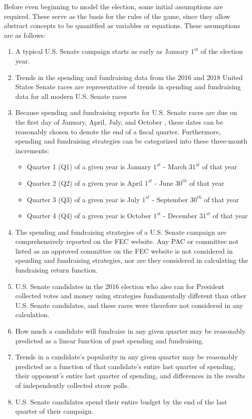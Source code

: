 \documentclass[11pt]{article}
\begin{document}
Before even beginning to model the election, some initial assumptions are
required. These serve as the basis for the rules of the game, since they allow
abstract concepts to be quanitfied as variables or equations. These assumptions
are as follows:
\begin{enumerate}
\item A typical U.S. Senate campaign starts as early as January $1^{st}$ of the
election year.
\item Trends in the spending and fundraising data from the 2016 and 2018 United
States Senate races are representative of trends in spending and fundraising
data for all modern U.S. Senate races
\item Because spending and fundraising reports for U.S. Senate races are due on
the first day of January, April, July, and October \cite{fecform}, these
dates can be reasonably chosen to denote the end of a fiscal
quarter. Furthermore, spending and fundraising strategies can be categorized
into these three-month increments:
\begin{itemize}
\item Quarter 1 (Q1) of a given year is January $1^{st}$ - March $31^{st}$ of
that year
\item Quarter 2 (Q2) of a given year is April $1^{st}$ - June $30^{th}$ of
that year
\item Quarter 3 (Q3) of a given year is July $1^{st}$ - September $30^{th}$
of that year
\item Quarter 4 (Q4) of a given year is October $1^{st}$ - December $31^{st}$
of that year
\end{itemize}
\item The spending and fundraising strategies of a U.S. Senate campaign are
comprehensively reported on the FEC website. Any PAC or committee not listed
as an approved committee on the FEC website is not considered in spending and
fundraising strategies, nor are they considered in calculating the
fundraising return function.
\item U.S. Senate candidates in the 2016 election who also ran for President
collected votes and money using strategies fundamentally different than other
U.S. Senate candidates, and these races were therefore not considered in any
calculation.
\item How much a candidate will fundraise in any given quarter may be
reasonably predicted as a linear function of past spending and fundraising.
\item Trends in a candidate's popularity in any given quarter may be reasonably
predicted as a function of that candidate's entire last quarter of spending,
their opponent's entire last quarter of spending, and differences in the
results of independently collected straw polls.
\item U.S. Senate candidates spend their entire budget by the end of the last quarter of their campaign.
\end{enumerate}
\end{document}

